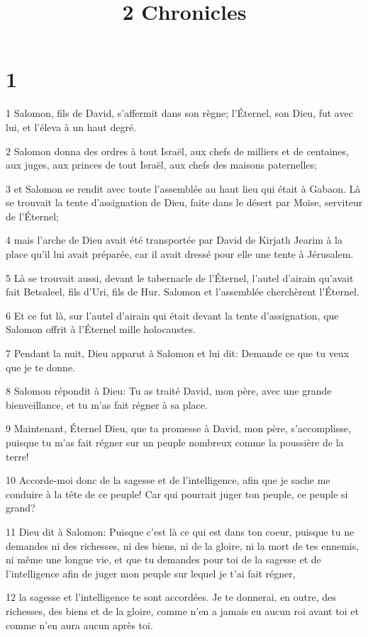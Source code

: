 

\title{2 Chronicles}


\chapter{1}

\par 1 Salomon, fils de David, s'affermit dans son règne; l'Éternel, son Dieu, fut avec lui, et l'éleva à un haut degré.
\par 2 Salomon donna des ordres à tout Israël, aux chefs de milliers et de centaines, aux juges, aux princes de tout Israël, aux chefs des maisons paternelles;
\par 3 et Salomon se rendit avec toute l'assemblée au haut lieu qui était à Gabaon. Là se trouvait la tente d'assignation de Dieu, faite dans le désert par Moïse, serviteur de l'Éternel;
\par 4 mais l'arche de Dieu avait été transportée par David de Kirjath Jearim à la place qu'il lui avait préparée, car il avait dressé pour elle une tente à Jérusalem.
\par 5 Là se trouvait aussi, devant le tabernacle de l'Éternel, l'autel d'airain qu'avait fait Betsaleel, fils d'Uri, fils de Hur. Salomon et l'assemblée cherchèrent l'Éternel.
\par 6 Et ce fut là, sur l'autel d'airain qui était devant la tente d'assignation, que Salomon offrit à l'Éternel mille holocaustes.
\par 7 Pendant la nuit, Dieu apparut à Salomon et lui dit: Demande ce que tu veux que je te donne.
\par 8 Salomon répondit à Dieu: Tu as traité David, mon père, avec une grande bienveillance, et tu m'as fait régner à sa place.
\par 9 Maintenant, Éternel Dieu, que ta promesse à David, mon père, s'accomplisse, puisque tu m'as fait régner sur un peuple nombreux comme la poussière de la terre!
\par 10 Accorde-moi donc de la sagesse et de l'intelligence, afin que je sache me conduire à la tête de ce peuple! Car qui pourrait juger ton peuple, ce peuple si grand?
\par 11 Dieu dit à Salomon: Puisque c'est là ce qui est dans ton coeur, puisque tu ne demandes ni des richesses, ni des biens, ni de la gloire, ni la mort de tes ennemis, ni même une longue vie, et que tu demandes pour toi de la sagesse et de l'intelligence afin de juger mon peuple sur lequel je t'ai fait régner,
\par 12 la sagesse et l'intelligence te sont accordées. Je te donnerai, en outre, des richesses, des biens et de la gloire, comme n'en a jamais eu aucun roi avant toi et comme n'en aura aucun après toi.

